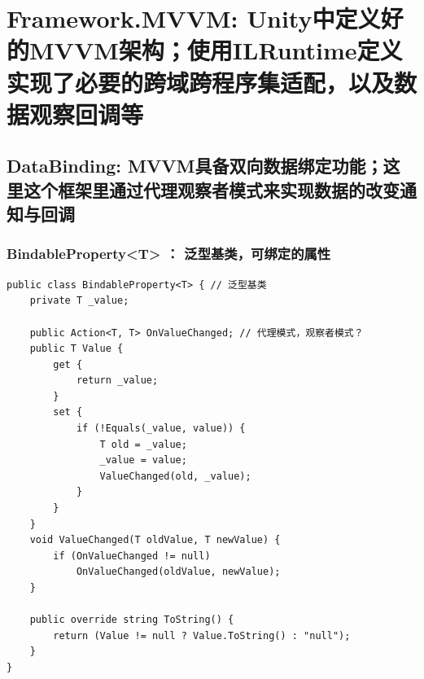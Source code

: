 \documentclass[9pt, b5paper]{article}
\begin{document}
\section{Framework.MVVM: Unity中定义好的MVVM架构；使用ILRuntime定义实现了必要的跨域跨程序集适配，以及数据观察回调等}
\label{sec-6}
\subsection{DataBinding: MVVM具备双向数据绑定功能；这里这个框架里通过代理观察者模式来实现数据的改变通知与回调}
\label{sec-6-1}
\subsubsection{BindableProperty<T> ： 泛型基类，可绑定的属性}
\label{sec-6-1-1}
\begin{verbatim}
public class BindableProperty<T> { // 泛型基类
    private T _value;

    public Action<T, T> OnValueChanged; // 代理模式，观察者模式？
    public T Value {
        get {
            return _value;
        }
        set {
            if (!Equals(_value, value)) {
                T old = _value;
                _value = value;
                ValueChanged(old, _value);
            }
        }
    }
    void ValueChanged(T oldValue, T newValue) {
        if (OnValueChanged != null) 
            OnValueChanged(oldValue, newValue);
    }

    public override string ToString() {
        return (Value != null ? Value.ToString() : "null");
    }
}
\end{verbatim}
\end{document}
